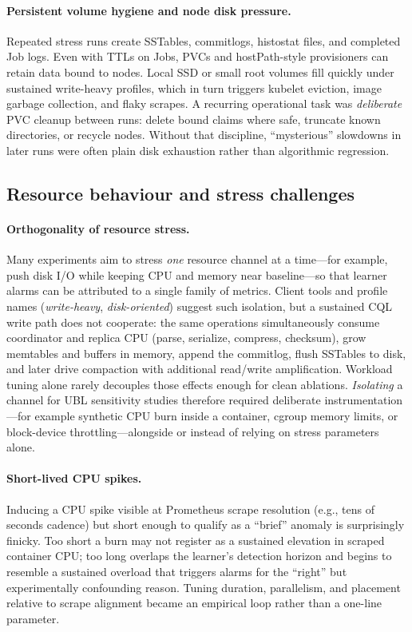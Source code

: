 \documentclass[11pt,a4paper]{article}
\begin{document}
\paragraph{Persistent volume hygiene and node disk pressure.}
Repeated stress runs create SSTables, commitlogs, histostat files, and completed Job logs. Even with TTLs on Jobs, PVCs and hostPath-style provisioners can retain data bound to nodes. Local SSD or small root volumes fill quickly under sustained write-heavy profiles, which in turn triggers kubelet eviction, image garbage collection, and flaky scrapes. A recurring operational task was \emph{deliberate} PVC cleanup between runs: delete bound claims where safe, truncate known directories, or recycle nodes. Without that discipline, ``mysterious'' slowdowns in later runs were often plain disk exhaustion rather than algorithmic regression.

\subsection{Resource behaviour and stress challenges}
\label{subsec:challenges-stress}

\paragraph{Orthogonality of resource stress.}
Many experiments aim to stress \emph{one} resource channel at a time---for example, push disk I/O while keeping CPU and memory near baseline---so that learner alarms can be attributed to a single family of metrics. Client tools and profile names (\emph{write-heavy}, \emph{disk-oriented}) suggest such isolation, but a sustained CQL write path does not cooperate: the same operations simultaneously consume coordinator and replica CPU (parse, serialize, compress, checksum), grow memtables and buffers in memory, append the commitlog, flush SSTables to disk, and later drive compaction with additional read/write amplification. Workload tuning alone rarely decouples those effects enough for clean ablations. \emph{Isolating} a channel for UBL sensitivity studies therefore required deliberate instrumentation---for example synthetic CPU burn inside a container, cgroup memory limits, or block-device throttling---alongside or instead of relying on stress parameters alone.

\paragraph{Short-lived CPU spikes.}
Inducing a CPU spike visible at Prometheus scrape resolution (e.g., tens of seconds cadence) but short enough to qualify as a ``brief'' anomaly is surprisingly finicky. Too short a burn may not register as a sustained elevation in scraped container CPU; too long overlaps the learner's detection horizon and begins to resemble a sustained overload that triggers alarms for the ``right'' but experimentally confounding reason. Tuning duration, parallelism, and placement relative to scrape alignment became an empirical loop rather than a one-line parameter.
\end{document}
